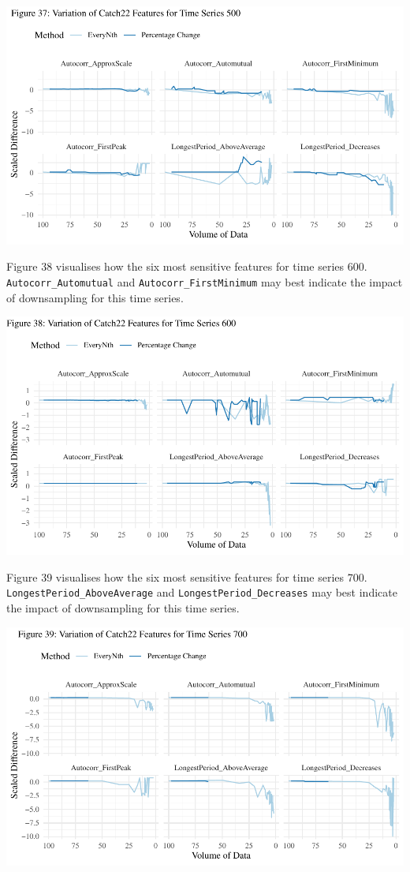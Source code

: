 \documentclass{article}
\begin{document}
\includegraphics{210431461_CSC8639_Dissertation_files/figure-latex/Catch22Variation500-1.pdf}

\newpage

Figure 38 visualises how the six most sensitive features for time series
600. \texttt{Autocorr\_Automutual} and \texttt{Autocorr\_FirstMinimum}
may best indicate the impact of downsampling for this time series.

\includegraphics{210431461_CSC8639_Dissertation_files/figure-latex/Catch22Variation600-1.pdf}

Figure 39 visualises how the six most sensitive features for time series
700. \texttt{LongestPeriod\_AboveAverage} and
\texttt{LongestPeriod\_Decreases} may best indicate the impact of
downsampling for this time series.

\includegraphics{210431461_CSC8639_Dissertation_files/figure-latex/Catch22Variation700-1.pdf}
\end{document}
